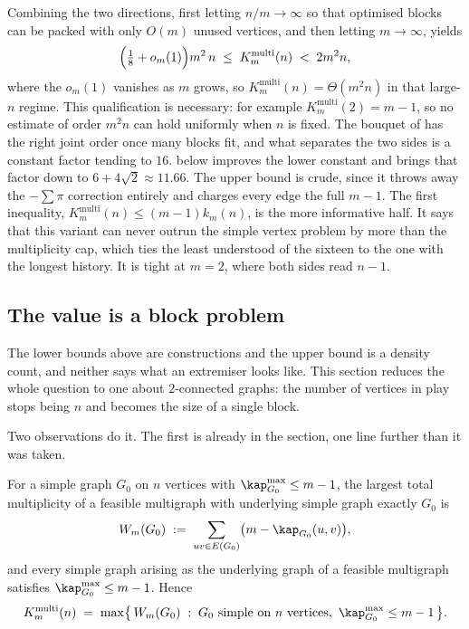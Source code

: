 Combining the two directions, first letting $n/m\to\infty$ so that optimised blocks can be packed with only $O(m)$ unused vertices, and then letting $m\to\infty$, yields
\[
    \Bigl(\tfrac{1}{8} + o_m(1)\Bigr) m^2 \, n
    \;\le\; K_m^{\mathrm{multi}}(n) \;<\; 2 m^2 n ,
\]
where the $o_m(1)$ vanishes as $m$ grows,
so $K_m^{\mathrm{multi}}(n) = \Theta(m^2 n)$ in that large-$n$ regime. This qualification is necessary: for example $K_m^{\mathrm{multi}}(2)=m-1$, so no estimate of order $m^2n$ can hold uniformly when $n$ is fixed. The bouquet of  has the right joint order once many blocks fit, and what separates the two sides is a constant factor tending to $16$.  below improves the lower constant and brings that factor down to $6 + 4\sqrt{2} \approx 11.66$. The upper bound is crude, since it throws away the $-\sum \pi$ correction entirely and charges every edge the full $m-1$. The first inequality, $K_m^{\mathrm{multi}}(n) \le (m-1)k_m(n)$, is the more informative half. It says that this variant can never outrun the simple vertex problem by more than the multiplicity cap, which ties the least understood of the sixteen to the one with the longest history. It is tight at $m = 2$, where both sides read $n-1$.

\subsection{The value is a block problem}\label{sec:multi-vertex-blocks}

The lower bounds above are constructions and the upper bound is a density count, and neither says what an extremiser looks like. This section reduces the whole question to one about $2$-connected graphs: the number of vertices in play stops being $n$ and becomes the size of a single block.

Two observations do it. The first is already in the section, one line further than it was taken.

\begin{lemma}\label{lem:multi-vertex-objective}
For a simple graph $G_0$ on $n$ vertices with $\kap^{\max}_{G_0} \le m-1$, the largest total multiplicity of a feasible multigraph with underlying simple graph exactly $G_0$ is
\[
    W_m(G_0) \;:=\; \sum_{uv \in E(G_0)} \bigl(m - \kap_{G_0}(u,v)\bigr) ,
\]
and every simple graph arising as the underlying graph of a feasible multigraph satisfies $\kap^{\max}_{G_0} \le m-1$. Hence
\[
    K_m^{\mathrm{multi}}(n) \;=\; \max\bigl\{\, W_m(G_0) \;:\; G_0 \text{ simple on } n \text{ vertices},\ \kap^{\max}_{G_0} \le m-1 \,\bigr\} .
\]
\end{lemma}


